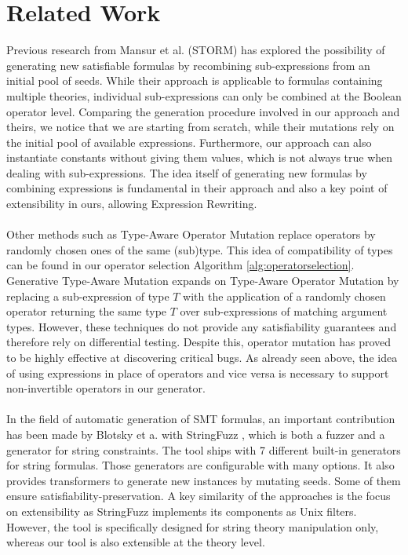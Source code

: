 \documentclass[sigplan,screen]{acmart}
\begin{document}
\section{Related Work} \label{sec:relatedwork}
Previous research from Mansur et al. (STORM) \cite{STORM} has explored the possibility of generating new satisfiable formulas by recombining sub-expressions from an initial pool of seeds. While their approach is applicable to formulas containing multiple theories, individual sub-expressions can only be combined at the Boolean operator level. Comparing the generation procedure involved in our approach and theirs, we notice that we are starting from scratch, while their mutations rely on the initial pool of available expressions. Furthermore, our approach can also instantiate constants without giving them values, which is not always true when dealing with sub-expressions. The idea itself of generating new formulas by combining expressions is fundamental in their approach and also a key point of extensibility in ours, allowing Expression Rewriting. 
\\ \\
Other methods such as Type-Aware Operator Mutation \cite{TAOM} replace operators by randomly chosen ones of the same (sub)type. This idea of compatibility of types can be found in our operator selection Algorithm \ref{alg:operatorselection}. Generative Type-Aware Mutation \cite{GTAM} expands on Type-Aware Operator Mutation by replacing a sub-expression of type $T$ with the application of a randomly chosen operator returning the same type $T$ over sub-expressions of matching argument types. However, these techniques do not provide any satisfiability guarantees and therefore rely on differential testing. Despite this, operator mutation has proved to be highly effective at discovering critical bugs. As already seen above, the idea of using expressions in place of operators and vice versa is necessary to support non-invertible operators in our generator.
\\ \\
In the field of automatic generation of SMT formulas, an important contribution has been made by Blotsky et a. with StringFuzz \cite{StringFuzz}, which is both a fuzzer and a generator for string constraints. The tool ships with 7 different built-in generators for string formulas. Those generators are configurable with many options. It also provides transformers to generate new instances by mutating seeds. Some of them ensure satisfiability-preservation. A key similarity of the approaches is the focus on extensibility as StringFuzz implements its components as Unix filters. However, the tool is specifically designed for string theory manipulation only, whereas our tool is also extensible at the theory level.
\end{document}
